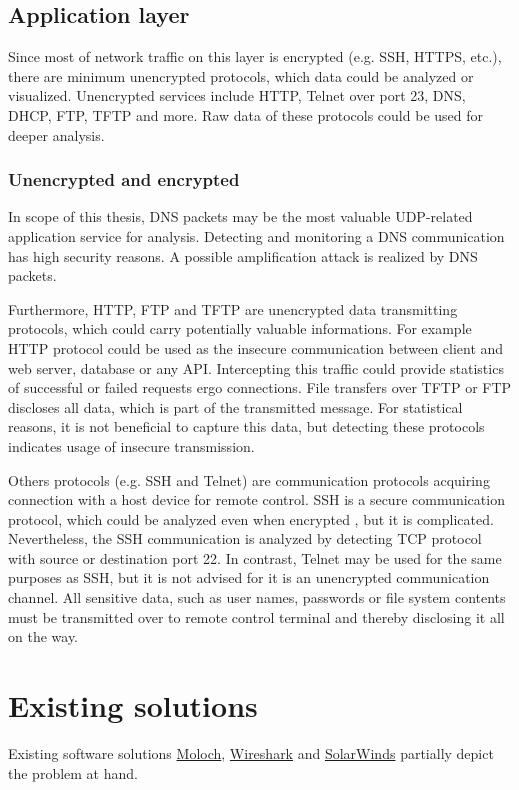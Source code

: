 \documentclass[12pt,a4paper,twoside]{report}
\begin{document}
		\subsection{Application layer} \label{analysis:data:application}
			Since most of network traffic on this layer is encrypted (e.g. SSH, HTTPS, etc.), there are minimum unencrypted protocols, which data could be analyzed or visualized. Unencrypted services include HTTP, Telnet over port 23, DNS, DHCP, FTP, TFTP and more. Raw data of these protocols could be used for deeper analysis.\par
			\subsubsection{Unencrypted and encrypted} \label{analysis:data:application:encr}
				In scope of this thesis, DNS packets may be the most valuable UDP-related application service for analysis. Detecting and monitoring a DNS communication has high security reasons. A possible amplification attack is realized by DNS packets.\par
				Furthermore, HTTP, FTP and TFTP are unencrypted data transmitting protocols, which could carry potentially valuable informations. For example HTTP protocol could be used as the insecure communication between client and web server, database or any API. Intercepting this traffic could provide statistics of successful or failed requests ergo connections. File transfers over TFTP or FTP discloses all data, which is part of the transmitted message. For statistical reasons, it is not beneficial to capture this data, but detecting these protocols indicates usage of insecure transmission.\par
				Others protocols (e.g. SSH and Telnet) are communication protocols acquiring connection with a host device for remote control. SSH is a secure communication protocol, which could be analyzed even when encrypted \cite{web:ssh}, but it is complicated. Nevertheless, the SSH communication is analyzed by detecting TCP protocol with source or destination port 22. In contrast, Telnet may be used for the same purposes as SSH, but it is not advised for it is an unencrypted communication channel. All sensitive data, such as user names, passwords or file system contents must be transmitted over to remote control terminal and thereby disclosing it all on the way.
	\section{Existing solutions} \label{analysis:solutions}
		Existing software solutions \hyperref[analysis:solutions:moloch]{Moloch}, \hyperref[analysis:solutions:wireshark]{Wireshark} and \hyperref[analysis:solutions:solarwinds]{SolarWinds} partially depict the problem at hand.
\end{document}
